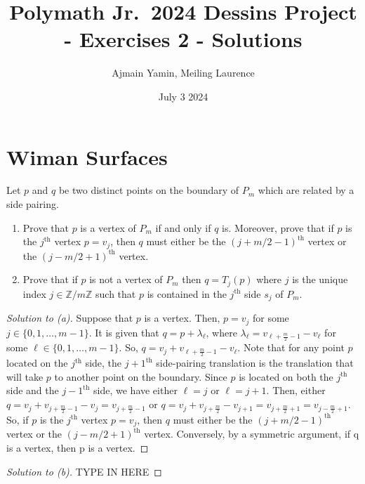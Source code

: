 \documentclass{article}
\title{Polymath Jr.\ 2024 Dessins Project - Exercises 2 - Solutions}
\author{Ajmain Yamin, Meiling Laurence}
\date{July 3 2024}
\begin{document}
\maketitle

\section{Wiman Surfaces}

\begin{exercise}  Let $p$ and $q$ be two distinct points on the boundary of $P_m$ which are related by a side pairing.
\begin{enumerate}
\item[(a)] Prove that $p$ is a vertex of $P_m$ if and only if $q$ is.  Moreover, prove that if $p$ is the $j^\text{th}$ vertex $p = v_j$, then $q$ must either be the $(j+m/2-1)^\text{th}$ vertex or the $(j-m/2+1)^\text{th}$ vertex.
\item[(b)] Prove that if $p$ is not a vertex of $P_m$ then $q = T_j(p)$ where $j$ is the unique index $j\in \mathbb{Z}/m\mathbb{Z}$ such that $p$ is contained in the $j^\text{th}$ side $s_j$ of $P_m$.
\end{enumerate}
\end{exercise}

\begin{proof}[Solution to \textup{(a)}]
Suppose that \( p \) is a vertex. Then, \( p = v_j \) for some \( j  \in \{0, 1, \dots, m-1\}\). It is given that \(q = p + \lambda_\ell\), where \(\lambda_\ell = v_{\ell + \frac{m}{2} - 1} - v_\ell\) for some \( \ell  \in \{0, 1, \dots, m-1\}\).  So, \( q = v_j + v_{\ell + \frac{m}{2} - 1} - v_\ell\). Note that for any point $p$ located on the $j^\text{th}$ side, the $j + 1^\text{th}$ side-pairing translation is the translation that will take $p$ to another point on the boundary. Since $p$ is located on both the $j^\text{th}$ side and the $j - 1^\text{th}$ side, we have either \(\ell = j\) or \(\ell = j + 1\). Then, either \(q = v_j + v_{j  + \frac{m}{2} - 1} - v_j = v_{j + \frac{m}{2} - 1}\) or \(q = v_j + v_{j + \frac{m}{2}} - v_{j + 1} = v_{j + \frac{m}{2} + 1} = v_{j - \frac{m}{2} + 1}\). So, if $p$ is the $j^\text{th}$ vertex $p = v_j$, then $q$ must either be the $(j+m/2-1)^\text{th}$ vertex or the $(j-m/2+1)^\text{th}$ vertex. Conversely, by a symmetric argument, if q is a vertex, then p is a vertex.
\end{proof}

\begin{proof}[Solution to \textup{(b)}]
TYPE IN HERE
\end{proof}
\end{document}

